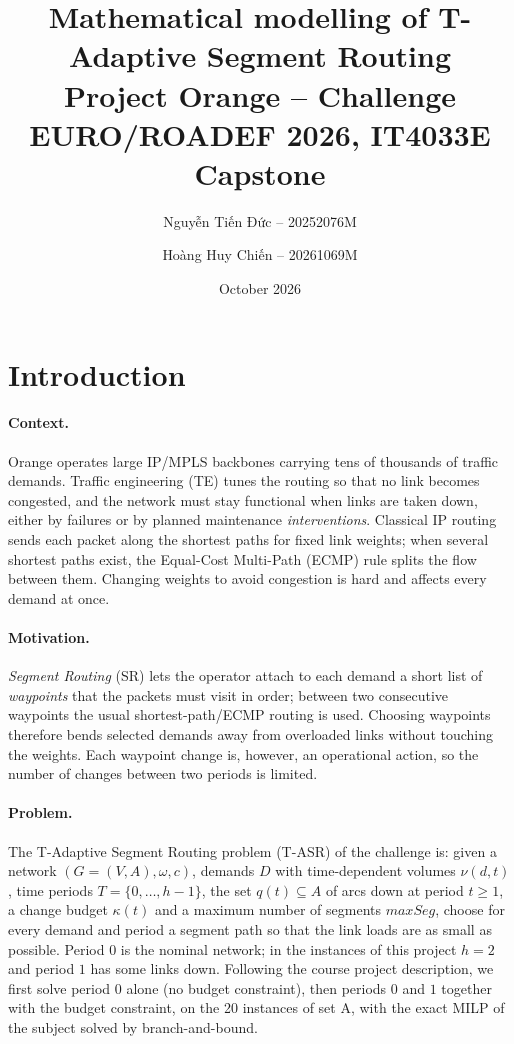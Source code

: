 \documentclass[11pt,a4paper]{article}
\title{Mathematical modelling of T-Adaptive Segment Routing\\[2pt]
\large Project Orange -- Challenge EURO/ROADEF 2026, IT4033E Capstone}
\author{{\fontencoding{T5}\selectfont Nguyễn Tiến Đức} -- 20252076M \and {\fontencoding{T5}\selectfont Hoàng Huy Chiến} -- 20261069M}
\date{October 2026}
\begin{document}
\maketitle

\section{Introduction}

\paragraph{Context.} Orange operates large IP/MPLS backbones carrying tens of thousands of traffic
demands. Traffic engineering (TE) tunes the routing so that no link becomes congested, and the network
must stay functional when links are taken down, either by failures or by planned maintenance
\emph{interventions}. Classical IP routing sends each packet along the shortest paths for fixed link
weights; when several shortest paths exist, the Equal-Cost Multi-Path (ECMP) rule splits the flow
between them. Changing weights to avoid congestion is hard and affects every demand at once.

\paragraph{Motivation.} \emph{Segment Routing} (SR) lets the operator attach to each demand a short list
of \emph{waypoints} that the packets must visit in order; between two consecutive waypoints the usual
shortest-path/ECMP routing is used. Choosing waypoints therefore bends selected demands away from
overloaded links without touching the weights. Each waypoint change is, however, an operational action,
so the number of changes between two periods is limited.

\paragraph{Problem.} The T-Adaptive Segment Routing problem (T-ASR) of the challenge is: given a
network $(G=(V,A),\omega,c)$, demands $D$ with time-dependent volumes $\nu(d,t)$, time periods
$T=\{0,\dots,h-1\}$, the set $q(t)\subseteq A$ of arcs down at period $t\geq1$, a change budget
$\kappa(t)$ and a maximum number of segments $maxSeg$, choose for every demand and period a segment
path so that the link loads are as small as possible. Period $0$ is the nominal network; in the
instances of this project $h=2$ and period $1$ has some links down. Following the course project
description, we first solve period $0$ alone (no budget constraint), then periods $0$ and $1$ together
with the budget constraint, on the 20 instances of set A, with the exact MILP of the subject solved by
branch-and-bound.
\end{document}
